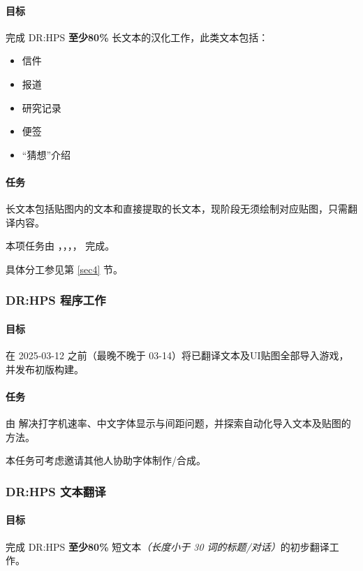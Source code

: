 \documentclass[UTF8, a4paper, 12pt]{ctexart}
\begin{document}
\paragraph{目标} 完成 DR:HPS \textbf{至少80\%} 长文本的汉化工作，此类文本包括：

\begin{itemize}
    \item 信件
    \item 报道
    \item 研究记录
    \item 便签
    \item “猜想”介绍
\end{itemize}

\paragraph{任务} 长文本包括贴图内的文本和直接提取的长文本，现阶段无须绘制对应贴图，只需翻译内容。

本项任务由 ，，，， 完成。

具体分工参见第 \ref{sec4} 节。

\subsubsection{DR:HPS 程序工作}
\paragraph{目标} 在 2025-03-12 之前（最晚不晚于 03-14）将已翻译文本及UI贴图全部导入游戏，并发布初版构建。

\paragraph{任务} 由  解决打字机速率、中文字体显示与间距问题，并探索自动化导入文本及贴图的方法。

本任务可考虑邀请其他人协助字体制作/合成。

\subsubsection{DR:HPS 文本翻译}

\paragraph{目标} 完成 DR:HPS \textbf{至少80\%} 短文本\emph{（长度小于 30 词的标题/对话）}的初步翻译工作。
\end{document}
